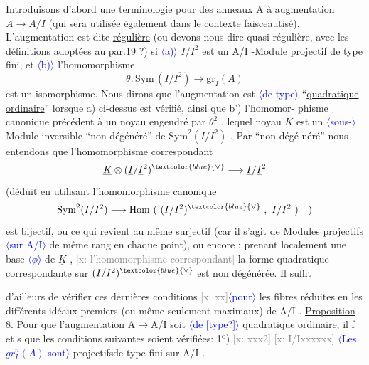 \documentclass[11pt]{article}
\newcommand{\scanpage}[1]{\par\bigskip\noindent{\small\sffamily[scan #1]}\par}
\newcommand{\mspage}[1]{{\small\sffamily[p.\,#1]}}
\newcommand{\hand}[1]{\textcolor{blue}{#1}}
\newcommand{\inserted}[2][]{\textcolor{blue}{$\langle$#2$\rangle$}}
\newcommand{\xout}[1]{\textcolor{gray}{[\textsf{x:} #1]}}
\newcommand{\uline}[1]{\underline{#1}}
\newcommand{\unsure}[1]{[#1?]}
\begin{document}
Introduisons d'abord une terminologie pour des anneaux A à
augmentation $A \to A/I$ (qui sera utilisée également dans le contexte
faisceautisé). L'augmentation est dite \uline{régulière} (ou devons nous dire
quasi-régulière, avec les définitions adoptées au par.19 ?) si \inserted{a)} $I/I^2$ est
un A/I -Module projectif de type fini, et \inserted{b)} l'homomorphisme
\[ \theta\colon \mathrm{Sym}\,(I/I^2) \longrightarrow \mathrm{gr}_I(A) \]
est un isomorphisme. Nous dirons que l'augmentation est \inserted{de type} ``\uline{quadratique}
\uline{ordinaire}'' lorsque a) ci-dessus est vérifié, ainsi que b') l'homomor-%
phisme canonique précédent à un noyau engendré par $\theta^2$ , lequel noyau $\underline{K}$
est un \inserted{sous-}Module inversible ``non dégénéré'' de $\mathrm{Sym}^2(I/I^2)$ . Par ``non dégé%
néré'' nous entendons que l'homomorphisme correspondant
\[ \underline{K} \otimes (\underline{I}/\underline{I}^2)^{\hand{\vee}} \longrightarrow \underline{I}/\underline{I}^2 \]
(déduit en utilisant l'homomorphisme canonique
\[ \mathrm{Sym}^2(I/I^2) \longrightarrow \mathrm{Hom}\ (\ (I/I^2)^{\hand{\vee}}\ ,\ I/I^2\ )\quad ) \]
est bijectif, ou ce qui revient au même surjectif (car il s'agit de
Modules projectifs \inserted{sur A/I} de même rang en chaque point), ou encore : prenant
localement une base \inserted{$\phi$} de $\underline{K}$ , \xout{l'homomorphisme correspondant} la forme
quadratique correspondante sur $(I/I^2)^{\hand{\vee}}$ est non dégénérée. Il suffit

\mspage{149}

\clearpage
\scanpage{25/150}
\mspage{11}
d'ailleurs de vérifier ces dernières conditions \xout{xx}\inserted{pour} les fibres réduites
en les différents idéaux premiers (ou même seulement maximaux) de A/I .
\uline{Proposition} 8. Pour que l'augmentation A$\rightarrow$A/I soit \inserted{de \unsure{type}} quadratique
ordinaire, il f et s que les conditions suivantes soient vérifiées:
1º) \xout{xxx2} \xout{I/Ixxxxxx} \inserted[typed]{Les $gr^{n}_{I}(A)$ sont} projectifsde type fini sur A/I .
\end{document}
